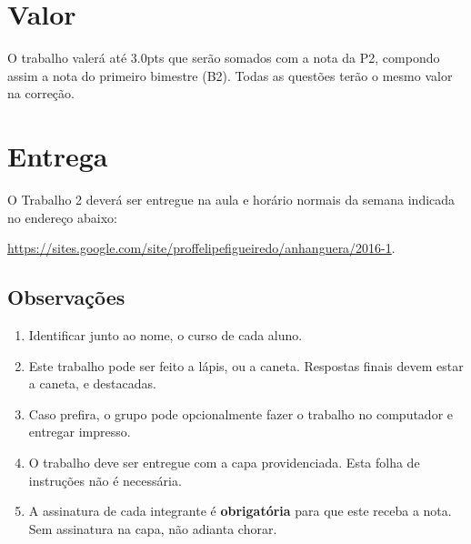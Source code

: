 \documentclass[a4paper]{article}
\begin{document}
\section{Valor}
O trabalho valerá até $3.0$pts que serão somados com a nota da P2, compondo assim a nota do primeiro bimestre (B2). Todas as questões terão o mesmo valor na correção.

\section{Entrega}

O Trabalho 2 deverá ser entregue na aula e horário normais da semana indicada no endereço abaixo:

\url{https://sites.google.com/site/proffelipefigueiredo/anhanguera/2016-1}.

\subsection{Observações}

\begin{enumerate}
\item Identificar junto ao nome, o curso de cada aluno.
\item Este trabalho pode ser feito a lápis, ou a caneta. Respostas finais devem estar a caneta, e destacadas. 
\item Caso prefira, o grupo pode opcionalmente fazer o trabalho no computador e entregar impresso.
\item O trabalho deve ser entregue com a capa providenciada. Esta folha de instruções não é necessária.
\item A assinatura de cada integrante é {\bf obrigatória} para que este receba a nota. Sem assinatura na capa, não adianta chorar.
\end{enumerate}
\end{document}
